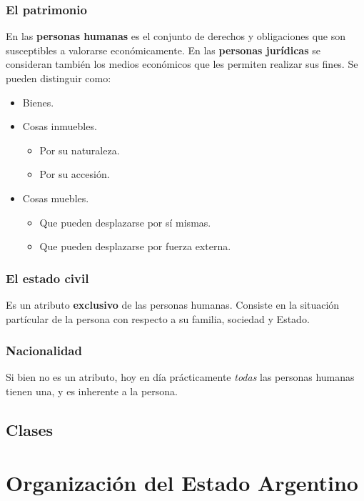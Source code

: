 \documentclass[../resumen.tex]{subfiles}
\begin{document}
\subsubsection{El patrimonio}

En las \textbf{personas humanas} es el conjunto de derechos y obligaciones que son susceptibles
a valorarse económicamente. En las \textbf{personas jurídicas} se consideran
también los medios económicos que les permiten realizar sus fines. Se pueden
distinguir como:

\begin{itemize}
  \item Bienes.
  \item Cosas inmuebles.
    \begin{itemize}
      \item Por su naturaleza.
      \item Por su accesión.
    \end{itemize}
  \item Cosas muebles.
      \begin{itemize}
        \item   Que pueden desplazarse por sí mismas.
        \item Que pueden desplazarse por fuerza externa.
      \end{itemize}
\end{itemize}

\subsubsection{El estado civil}

Es un atributo \textbf{exclusivo} de las personas humanas. Consiste en la situación
partícular de la persona con respecto a su familia, sociedad y Estado.

\subsubsection{Nacionalidad}

Si bien no es un atributo, hoy en día prácticamente \textit{todas} las personas
humanas tienen una, y es inherente a la persona.

\subsection{Clases}


\section{Organización del Estado Argentino}
\end{document}
